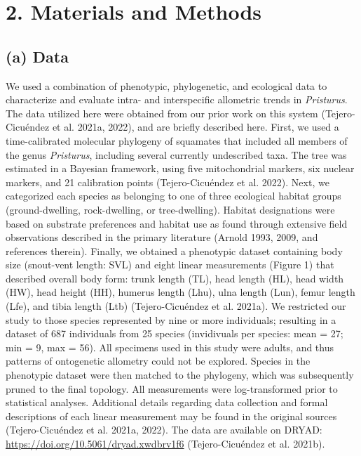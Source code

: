 \documentclass[
  11pt,
]{article}
\begin{document}
\hypertarget{materials-and-methods}{%
\section{2. Materials and Methods}\label{materials-and-methods}}

\hypertarget{a-data}{%
\subsection{(a) Data}\label{a-data}}

We used a combination of phenotypic, phylogenetic, and ecological data
to characterize and evaluate intra- and interspecific allometric trends
in \emph{Pristurus}. The data utilized here were obtained from our prior
work on this system (Tejero-Cicuéndez et al. 2021a, 2022), and are
briefly described here. First, we used a time-calibrated molecular
phylogeny of squamates that included all members of the genus
\emph{Pristurus}, including several currently undescribed taxa. The tree
was estimated in a Bayesian framework, using five mitochondrial markers,
six nuclear markers, and 21 calibration points (Tejero-Cicuéndez et al.
2022). Next, we categorized each species as belonging to one of three
ecological habitat groups (ground-dwelling, rock-dwelling, or
tree-dwelling). Habitat designations were based on substrate preferences
and habitat use as found through extensive field observations described
in the primary literature (Arnold 1993, 2009, and references therein).
Finally, we obtained a phenotypic dataset containing body size
(snout-vent length: SVL) and eight linear measurements (Figure 1) that
described overall body form: trunk length (TL), head length (HL), head
width (HW), head height (HH), humerus length (Lhu), ulna length (Lun),
femur length (Lfe), and tibia length (Ltb) (Tejero-Cicuéndez et al.
2021a). We restricted our study to those species represented by nine or
more individuals; resulting in a dataset of 687 individuals from 25
species (invidivuals per species: mean = 27; min = 9, max = 56). All
specimens used in this study were adults, and thus patterns of
ontogenetic allometry could not be explored. Species in the phenotypic
dataset were then matched to the phylogeny, which was subsequently
pruned to the final topology. All measurements were log-transformed
prior to statistical analyses. Additional details regarding data
collection and formal descriptions of each linear measurement may be
found in the original sources (Tejero-Cicuéndez et al. 2021a, 2022). The
data are available on DRYAD:
\url{https://doi.org/10.5061/dryad.xwdbrv1f6} (Tejero-Cicuéndez et al.
2021b).
\end{document}
